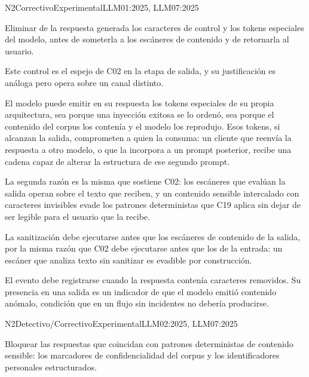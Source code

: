   {N2}{Correctivo}{Experimental}{LLM01:2025, LLM07:2025}

Eliminar de la respuesta generada los caracteres de control y los tokens especiales del modelo, antes de someterla a los escáneres de contenido y de retornarla al usuario.

Este control es el espejo de C02 en la etapa de salida, y su justificación es análoga pero opera sobre un canal distinto.

El modelo puede emitir en su respuesta los tokens especiales de su propia arquitectura, sea porque una inyección exitosa se lo ordenó, sea porque el contenido del corpus los contenía y el modelo los reprodujo. Esos tokens, si alcanzan la salida, comprometen a quien la consuma: un cliente que reenvía la respuesta a otro modelo, o que la incorpora a un prompt posterior, recibe una cadena capaz de alterar la estructura de ese segundo prompt.

La segunda razón es la misma que sostiene C02: los escáneres que evalúan la salida operan sobre el texto que reciben, y un contenido sensible intercalado con caracteres invisibles evade los patrones deterministas que C19 aplica sin dejar de ser legible para el usuario que la recibe.

La sanitización debe ejecutarse antes que los escáneres de contenido de la salida, por la misma razón que C02 debe ejecutarse antes que los de la entrada: un escáner que analiza texto sin sanitizar es evadible por construcción.

El evento debe registrarse cuando la respuesta contenía caracteres removidos. Su presencia en una salida es un indicador de que el modelo emitió contenido anómalo, condición que en un flujo sin incidentes no debería producirse.


  {N2}{Detectivo/Correctivo}{Experimental}{LLM02:2025, LLM07:2025}

Bloquear las respuestas que coincidan con patrones deterministas de contenido sensible: los marcadores de confidencialidad del corpus y los identificadores personales estructurados.

